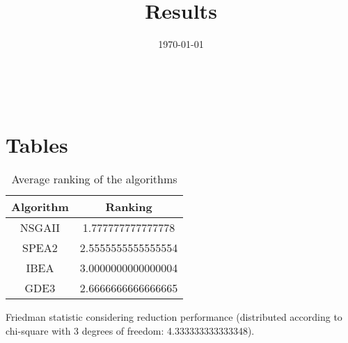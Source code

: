 \documentclass{article}
\title{Results}
\author{}
\date{\today}
\begin{document}
\oddsidemargin 0in \topmargin 0in\maketitle
\
\section{Tables}
\begin{table}[!htp]
\centering
\caption{Average ranking of the algorithms}
\begin{tabular}{c|c}
Algorithm&Ranking\\
\hline
NSGAII&1.777777777777778\\
SPEA2&2.5555555555555554\\
IBEA&3.0000000000000004\\
GDE3&2.6666666666666665\\
\end{tabular}
\end{table}


Friedman statistic considering reduction performance (distributed according to chi-square with 3 degrees of freedom: 4.333333333333348).
\end{document}
